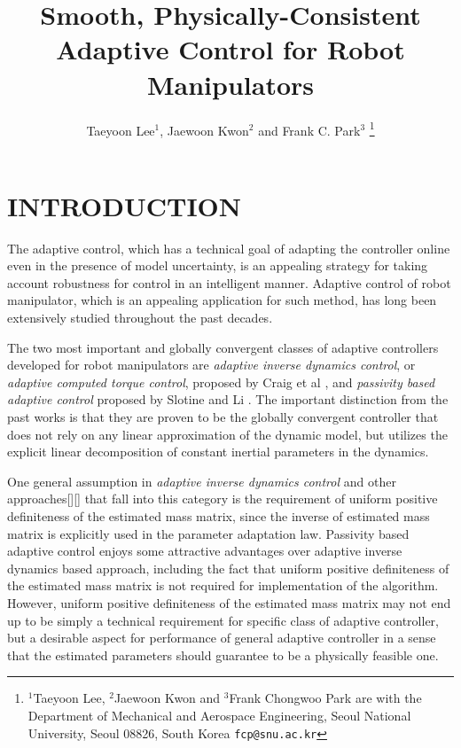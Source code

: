 \documentclass[letterpaper, 10 pt, conference]{ieeeconf}  %
\title{\LARGE \bf
Smooth, Physically-Consistent Adaptive Control for Robot Manipulators
}
\author{Taeyoon Lee$^{1}$, Jaewoon Kwon$^{2}$ and Frank C. Park$^{3}$%
\thanks{$^{1}$Taeyoon Lee, $^{2}$Jaewoon Kwon and $^{3}$Frank Chongwoo Park  are with the Department of
Mechanical and Aerospace Engineering, Seoul National University, Seoul
08826, South Korea 
        {\tt\small fcp@snu.ac.kr}}%
}
\begin{document}
\maketitle
\thispagestyle{empty}
\pagestyle{empty}


\begin{abstract}



\end{abstract}


\section{INTRODUCTION}

The adaptive control, which has a technical goal of adapting the controller online even in the presence of model uncertainty, is an appealing strategy for taking account robustness for control in an intelligent manner. Adaptive control of robot manipulator, which is an appealing application for such method, has long been extensively studied throughout the past decades.

The two most important and globally convergent classes of adaptive controllers developed for robot manipulators are {\em adaptive inverse dynamics control}, or {\em adaptive computed torque control}, proposed by Craig et al \cite{Craig_AdaptiveControl}, and {\em passivity based adaptive control} proposed by Slotine and Li \cite{Slotine_AdaptiveControl}. The important distinction from the past works is that they are proven to be the globally convergent controller that does not rely on any linear approximation of the dynamic model, but utilizes the explicit linear decomposition of constant inertial parameters in the dynamics. 

One general assumption in {\em adaptive inverse dynamics control} \cite{Craig_AdaptiveControl} and other approaches[][] that fall into this category is the requirement of uniform positive definiteness of the estimated mass matrix, since the inverse of estimated mass matrix is explicitly used in the parameter adaptation law. Passivity based adaptive control \cite{Slotine_AdaptiveControl} enjoys some attractive advantages over adaptive inverse dynamics based approach, including the fact that uniform positive definiteness of the estimated mass matrix is not required for implementation of the algorithm. However, uniform positive definiteness of the estimated mass matrix may not end up to be simply a technical requirement for specific class of adaptive controller, but a desirable aspect for performance of general adaptive controller in a sense that the estimated parameters should guarantee to be a physically feasible one.
\end{document}
